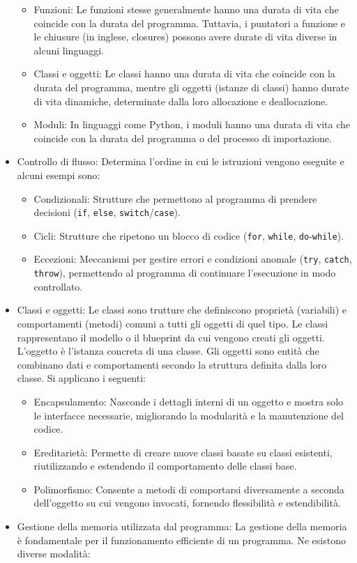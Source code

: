 \documentclass[
  letterpaper,
]{scrbook}
\providecommand{\tightlist}{%
  \setlength{\itemsep}{0pt}\setlength{\parskip}{0pt}}\usepackage{longtable,booktabs,array}
\begin{document}
\begin{itemize}
  \begin{itemize}
  \tightlist
  \item
    Funzioni: Le funzioni stesse generalmente hanno una durata di vita
    che coincide con la durata del programma. Tuttavia, i puntatori a
    funzione e le chiusure (in inglese, closures) possono avere durate
    di vita diverse in alcuni linguaggi.
  \item
    Classi e oggetti: Le classi hanno una durata di vita che coincide
    con la durata del programma, mentre gli oggetti (istanze di classi)
    hanno durate di vita dinamiche, determinate dalla loro allocazione e
    deallocazione.
  \item
    Moduli: In linguaggi come Python, i moduli hanno una durata di vita
    che coincide con la durata del programma o del processo di
    importazione.
  \end{itemize}
\item
  Controllo di flusso: Determina l'ordine in cui le istruzioni vengono
  eseguite e alcuni esempi sono:

  \begin{itemize}
  \tightlist
  \item
    Condizionali: Strutture che permettono al programma di prendere
    decisioni (\texttt{if}, \texttt{else},
    \texttt{switch}/\texttt{case}).
  \item
    Cicli: Strutture che ripetono un blocco di codice (\texttt{for},
    \texttt{while}, \texttt{do}-\texttt{while}).
  \item
    Eccezioni: Meccanismi per gestire errori e condizioni anomale
    (\texttt{try}, \texttt{catch}, \texttt{throw}), permettendo al
    programma di continuare l'esecuzione in modo controllato.
  \end{itemize}
\item
  Classi e oggetti: Le classi sono trutture che definiscono proprietà
  (variabili) e comportamenti (metodi) comuni a tutti gli oggetti di
  quel tipo. Le classi rappresentano il modello o il blueprint da cui
  vengono creati gli oggetti. L'oggetto è l'istanza concreta di una
  classe. Gli oggetti sono entità che combinano dati e comportamenti
  secondo la struttura definita dalla loro classe. Si applicano i
  seguenti:

  \begin{itemize}
  \tightlist
  \item
    Encapsulamento: Nasconde i dettagli interni di un oggetto e mostra
    solo le interfacce necessarie, migliorando la modularità e la
    manutenzione del codice.
  \item
    Ereditarietà: Permette di creare nuove classi basate su classi
    esistenti, riutilizzando e estendendo il comportamento delle classi
    base.
  \item
    Polimorfismo: Consente a metodi di comportarsi diversamente a
    seconda dell'oggetto su cui vengono invocati, fornendo flessibilità
    e estendibilità.
  \end{itemize}
\item
  Gestione della memoria utilizzata dal programma: La gestione della
  memoria è fondamentale per il funzionamento efficiente di un
  programma. Ne esistono diverse modalità:


\end{itemize}
\end{document}
